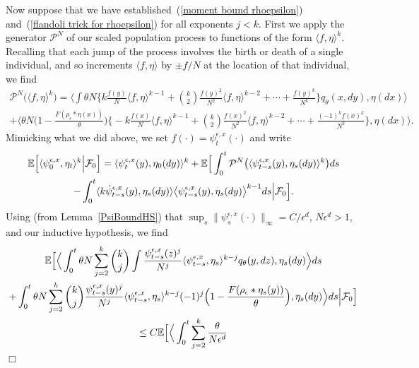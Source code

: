 \documentclass[12pt]{article}
\newenvironment {proof}{{\noindent\bf Proof }}{\hfill $\Box$ \medskip}
\newcommand{\IE}{\mathbb E}
\newcommand{\Pgen}{\mathcal{P}}    %
\numberwithin{equation}{section}
\begin{document}
\begin{proof}
Now suppose that we have established~(\ref{moment bound rhoepsilon}) 
and~(\ref{flandoli trick for rhoepsilon}) for all exponents $j<k$.
First we apply the generator $\Pgen^N$ of our scaled population process
to functions of the form $\langle f,\eta\rangle^k$.
Recalling that each jump of the process involves the birth or death of a single 
individual, and so increments $\langle f,\eta\rangle$ by $\pm f/N$ at the location of
that individual, we find 
\begin{multline}
\label{pgen applied to kth moment}
\Pgen^N\Big(\langle f,\eta\rangle^k\Big)
=
\Big\langle
\int\theta N\Big\{k\frac{f(y)}{N}\langle f,\eta\rangle^{k-1}+
\binom{k}{2}\frac{f(y)^2}{N^2}\langle f,\eta\rangle^{k-2}+\cdots
+\frac{f(y)^{k}}{N^{k}}\Big\}q_\theta(x,dy),\eta(dx)\Big\rangle
\\
+
\Big\langle\theta N\Big(1-\frac{F(\rho_\epsilon*\eta(x))}{\theta}\Big)
\Big\{-k\frac{f(x)}{N}\langle f,\eta\rangle^{k-1}+
\binom{k}{2}\frac{f(x)^2}{N^2}\langle f,\eta\rangle^{k-2}+\cdots
+\frac{(-1)^{k}f(x)^{k}}{N^{k}}\Big\},\eta(dx)\Big\rangle.
\end{multline}
Mimicking what we did above, we set $f(\cdot)=\psi^{\epsilon,x}_t(\cdot)$ and 
write
\begin{multline}
\label{kth moment for time varying function}
\IE\Big[\langle \psi^{\epsilon,x}_0,\eta_t\rangle^k\Big|{\cal F}_0\Big]
=\langle\psi^{\epsilon, x}_t(y),\eta_0(dy)\rangle^k
+\IE\Big[\int_0^t\Pgen^N\big(\langle\psi^{\epsilon,x}_{t-s}(y),\eta_s(dy)\rangle^k\big) ds
\\
-\int_0^t\langle k\dot{\psi}^{\epsilon,x}_{t-s}(y), \eta_s(dy)\rangle
\big\langle \psi^{\epsilon, x}_{t-s}(y),\eta_s(dy)\big\rangle^{k-1}ds
\Big|{\cal F}_0\Big].
\end{multline}
Using (from Lemma~\ref{PsiBoundHS}) 
that $\sup_s\|\psi^{\epsilon,x}_s(\cdot)\|_\infty=C/\epsilon^d$,
$N\epsilon^d>1$,
and our inductive
hypothesis, we find
\begin{multline*}
\IE\Big[
\Big\langle
\int_0^t\theta N\sum_{j=2}^{k}\binom{k}{j}\int
\frac{\psi_{t-s}^{\epsilon,x}(z)^j}{N^j}
\langle \psi^{\epsilon,x}_{t-s},\eta_s\rangle^{k-j}
q_\theta(y,dz),
\eta_s(dy)\Big\rangle ds 
\\
+
\int_0^t\theta N\sum_{j=2}^{k}\binom{k}{j}\frac{\psi_{t-s}^{\epsilon,x}(y)^j}{N^j}\langle \psi^{\epsilon,x}_{t-s},\eta_s\rangle^{k-j}
(-1)^j\Big(1-\frac{F(\rho_\epsilon*\eta_s(y))}{\theta} 
\Big),
\eta_s(dy)\Big\rangle ds\Big|{\cal F}_0\Big]
\\
\leq 
C\IE\Big[\Big\langle\int_0^t\sum_{j=2}^k\frac{\theta}{N\epsilon^d}

\end{multline*}
\end{proof}
\end{document}
